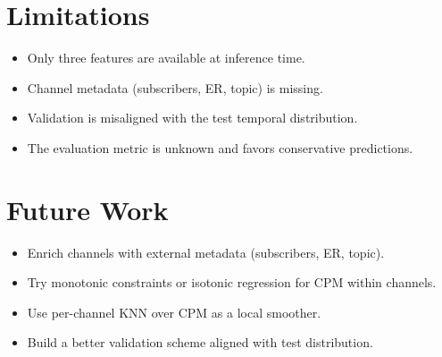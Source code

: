\documentclass[11pt]{article}
\begin{document}
\section{Limitations}
\begin{itemize}
    \item Only three features are available at inference time.
    \item Channel metadata (subscribers, ER, topic) is missing.
    \item Validation is misaligned with the test temporal distribution.
    \item The evaluation metric is unknown and favors conservative predictions.
\end{itemize}

\section{Future Work}
\begin{itemize}
    \item Enrich channels with external metadata (subscribers, ER, topic).
    \item Try monotonic constraints or isotonic regression for CPM within channels.
    \item Use per-channel KNN over CPM as a local smoother.
    \item Build a better validation scheme aligned with test distribution.
\end{itemize}
\end{document}
